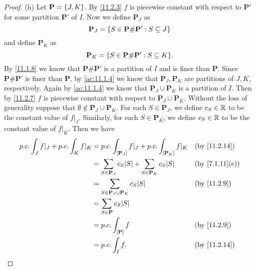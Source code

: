 \begin{proof}{(h)}
  Let \(\mathbf{P} = \left\lbrace J, K\right\rbrace\).
  By \cref{11.2.3} \(f\) is piecewise constant with respect to \(\mathbf{P}'\) for some partition \(\mathbf{P}'\) of \(I\).
  Now we define \(\mathbf{P}_J\) as
  \[
    \mathbf{P}_J = \left\lbrace S \in \mathbf{P} \# \mathbf{P}' : S \subseteq J\right\rbrace
  \]
  and define \(\mathbf{P}_K\) as
  \[
    \mathbf{P}_K = \set{S \in \mathbf{P} \# \mathbf{P}' : S \subseteq K}.
  \]
  By \cref{11.1.8} we know that \(\mathbf{P} \# \mathbf{P}'\) is a partition of \(I\) and is finer than \(\mathbf{P}\).
  Since \(\mathbf{P} \# \mathbf{P}'\) is finer than \(\mathbf{P}\), by \cref{ac:11.1.4} we know that \(\mathbf{P}_J, \mathbf{P}_K\) are partitions of \(J, K\), respectively.
  Again by \cref{ac:11.1.4} we know that \(\mathbf{P}_J \cup \mathbf{P}_K\) is a partition of \(I\).
  Then by \cref{11.2.7} \(f\) is piecewise constant with respect to \(\mathbf{P}_J \cup \mathbf{P}_K\).
  Without the loss of generality suppose that \(\emptyset \notin \mathbf{P}_J \cup \mathbf{P}_K\).
  For each \(S \in \mathbf{P}_J\), we define \(c_S \in \mathbb{R}\) to be the constant value of \(f|_J\).
  Similarly, for each \(S \in \mathbf{P}_K\), we define \(c_S \in \mathbb{R}\) to be the constant value of \(f|_K\).
  Then we have
  \begin{align*}
    p.c. \int_J f|_J + p.c. \int_K f|_K & = p.c. \int_{[\mathbf{P}_J]} f|_J + p.c. \int_{[\mathbf{P}_K]} f|_K             &  & \by{11.2.14}                 \\
                                        & = \sum_{S \in \mathbf{P}_J} c_S \abs{S} + \sum_{S \in \mathbf{P}_K} c_S \abs{S} &  & \text{(by \cref{7.1.11}(e))} \\
                                        & = \sum_{S \in \mathbf{P}_J \cup \mathbf{P}_K} c_S \abs{S}                       &  & \by{11.2.9}                  \\
                                        & = \sum_{S \in \mathbf{P}} c_S \abs{S}                                                                             \\
                                        & = p.c. \int_{[\mathbf{P}]} f                                                    &  & \by{11.2.9}                  \\
                                        & = p.c. \int_I f.                                                                &  & \by{11.2.14}
  \end{align*}
\end{proof}

